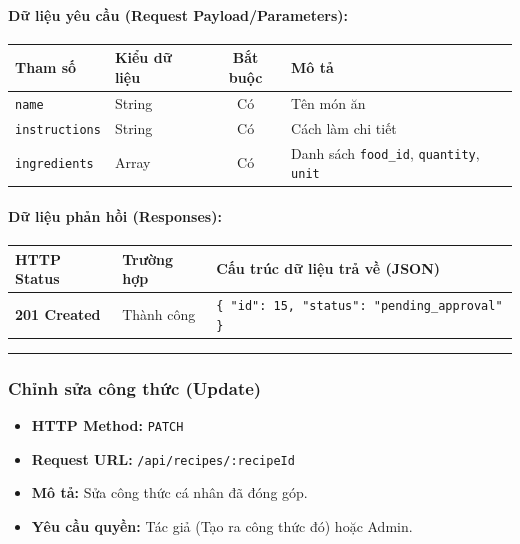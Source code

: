 \documentclass[12pt,a4paper]{article}
\begin{document}
\paragraph{Dữ liệu yêu cầu (Request Payload/Parameters):}
\begin{longtable}{|>{\raggedright\arraybackslash}p{2.8cm}|>{\raggedright\arraybackslash}p{2.2cm}|c|>{\raggedright\arraybackslash}p{7.0cm}|}
\hline
\textbf{Tham số} & \textbf{Kiểu dữ liệu} & \textbf{Bắt buộc} & \textbf{Mô tả} \\ \hline
\endhead
\texttt{name} & String & Có & Tên món ăn \\ \hline
\texttt{instructions} & String & Có & Cách làm chi tiết \\ \hline
\texttt{ingredients} & Array & Có & Danh sách \texttt{food\_id}, \texttt{quantity}, \texttt{unit} \\ \hline
\end{longtable}

\paragraph{Dữ liệu phản hồi (Responses):}
\begin{longtable}{|>{\raggedright\arraybackslash}p{2.8cm}|>{\raggedright\arraybackslash}p{3.2cm}|>{\raggedright\arraybackslash}p{8.0cm}|}
\hline
\textbf{HTTP Status} & \textbf{Trường hợp} & \textbf{Cấu trúc dữ liệu trả về (JSON)} \\ \hline
\endhead
\textbf{201 Created} & Thành công & \texttt{\{ "id": 15, "status": "pending\_approval" \}} \\ \hline
\end{longtable}

\vskip 0.4cm
\noindent\rule{\textwidth}{0.3pt}
\vskip 0.4cm

\subsubsection{Chỉnh sửa công thức (Update)}
\begin{itemize}[leftmargin=*]
    \item \textbf{HTTP Method:} \texttt{PATCH}
    \item \textbf{Request URL:} \texttt{/api/recipes/:recipeId}
    \item \textbf{Mô tả:} Sửa công thức cá nhân đã đóng góp.
    \item \textbf{Yêu cầu quyền:} Tác giả (Tạo ra công thức đó) hoặc Admin.
\end{itemize}
\end{document}
